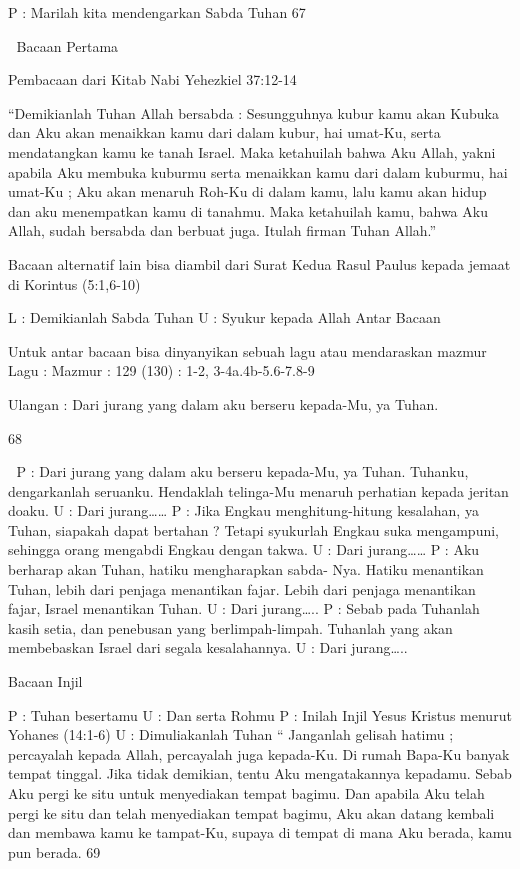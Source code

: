 P 
: Marilah kita mendengarkan Sabda Tuhan 
67 



Bacaan Pertama 

Pembacaan dari Kitab Nabi Yehezkiel 37:12-14 

“Demikianlah Tuhan Allah bersabda : Sesungguhnya kubur 
kamu akan Kubuka dan Aku akan menaikkan kamu dari dalam 
kubur, hai umat-Ku, serta mendatangkan kamu ke tanah Israel. 
Maka ketahuilah bahwa Aku Allah, yakni apabila Aku 
membuka kuburmu serta menaikkan kamu dari dalam 
kuburmu, hai umat-Ku ; Aku akan menaruh Roh-Ku di dalam 
kamu, lalu kamu akan hidup dan aku menempatkan kamu di 
tanahmu. 
Maka ketahuilah kamu, bahwa Aku Allah, sudah bersabda dan 
berbuat juga. Itulah firman Tuhan Allah.” 

Bacaan alternatif lain bisa diambil dari Surat Kedua Rasul 
Paulus kepada jemaat di Korintus (5:1,6-10) 

L : Demikianlah Sabda Tuhan 
U : Syukur kepada Allah 
Antar Bacaan 

Untuk antar bacaan bisa dinyanyikan sebuah lagu atau 
mendaraskan mazmur 
Lagu : 
Mazmur : 129 (130) : 1-2, 3-4a.4b-5.6-7.8-9 

Ulangan : Dari jurang yang dalam aku berseru kepada-Mu, ya 
Tuhan. 

68 



P : Dari jurang yang dalam aku berseru kepada-Mu, ya 
Tuhan. Tuhanku, dengarkanlah seruanku. Hendaklah 
telinga-Mu menaruh perhatian kepada jeritan doaku. 
U : Dari jurang…… 
P : Jika Engkau menghitung-hitung kesalahan, ya Tuhan, 
siapakah dapat bertahan ? Tetapi syukurlah Engkau suka 
mengampuni, sehingga orang mengabdi Engkau dengan 
takwa. 
U : Dari jurang…… 
P : Aku berharap akan Tuhan, hatiku mengharapkan sabda-
Nya. Hatiku menantikan Tuhan, lebih dari penjaga 
menantikan fajar. Lebih dari penjaga menantikan fajar, 
Israel menantikan Tuhan. 
U : Dari jurang….. 
P : Sebab pada Tuhanlah kasih setia, dan penebusan yang 
berlimpah-limpah. Tuhanlah yang akan membebaskan 
Israel dari segala kesalahannya. 
U : Dari jurang….. 

Bacaan Injil 

P : Tuhan besertamu 
U : Dan serta Rohmu 
P : Inilah Injil Yesus Kristus menurut Yohanes (14:1-6) 
U 
: Dimuliakanlah Tuhan 
“ Janganlah gelisah hatimu ; percayalah kepada Allah, 
percayalah juga kepada-Ku. Di rumah Bapa-Ku banyak 
tempat tinggal. Jika tidak demikian, tentu Aku 
mengatakannya kepadamu. Sebab Aku pergi ke situ untuk 
menyediakan tempat bagimu. Dan apabila Aku telah pergi 
ke situ dan telah menyediakan tempat bagimu, Aku akan 
datang kembali dan membawa kamu ke tampat-Ku, 
supaya di tempat di mana Aku berada, kamu pun berada. 
69 


